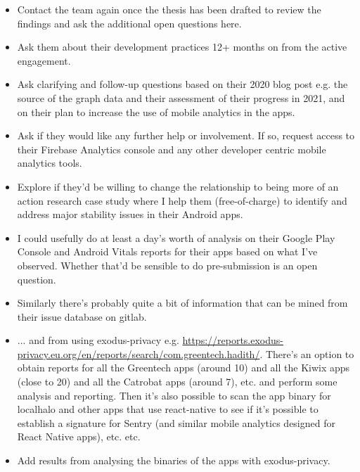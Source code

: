 {\small
\begin{itemize}
    \itemsep0em
    \item Contact the team again once the thesis has been drafted to review the findings and ask the additional open questions here. 
    \item Ask them about their development practices 12+ months on from the active engagement.
    \item Ask clarifying and follow-up questions based on their 2020 blog post e.g. the source of the graph data and their assessment of their progress in 2021, and on their plan to increase the use of mobile analytics in the apps.
    \item Ask if they would like any further help or involvement. If so, request access to their Firebase Analytics console and any other developer centric mobile analytics tools.
    \item Explore if they'd be willing to change the relationship to being more of an action research case study where I help them (free-of-charge) to identify and address major stability issues in their Android apps.
\end{itemize}

\begin{itemize}
    \itemsep0em
    \item I could usefully do at least a day's worth of analysis on their Google Play Console and Android Vitals reports for their apps based on what I've observed. Whether that'd be sensible to do pre-submission is an open question.
    \item Similarly there's probably quite a bit of information that can be mined from their issue database on gitlab.
    \item ... and from using exodus-privacy e.g. \url{https://reports.exodus-privacy.eu.org/en/reports/search/com.greentech.hadith/}. There's an option to obtain reports for all the Greentech apps (around 10) and all the Kiwix apps (close to 20) and all the Catrobat apps (around 7), etc. and perform some analysis and reporting. Then it's also possible to scan the app binary for localhalo and other apps that use react-native to see if it's possible to establish a signature for Sentry (and similar mobile analytics designed for React Native apps), etc. etc. 
    \item Add results from analysing the binaries of the apps with exodus-privacy.
\end{itemize}
}  %

\clearpage

